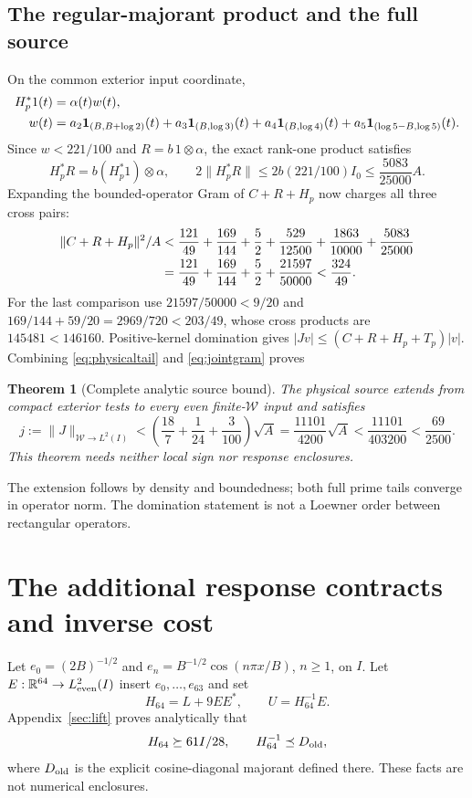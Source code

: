 \documentclass[11pt,a4paper]{article}
\numberwithin{equation}{section}
\newtheorem{theorem}{Theorem}[section]
\theoremstyle{remark}\newtheorem{remark}[theorem]{Remark}
\newcommand{\R}{\mathbb R}\newcommand{\C}{\mathbb C}
\newcommand{\norm}[1]{\lVert#1\rVert}\newcommand{\abs}[1]{\lvert#1\rvert}
\newcommand{\wo}{\mathcal W}\newcommand{\HS}{\mathrm{HS}}
\begin{document}
\subsection{The regular-majorant product and the full source}
On the common exterior input coordinate,
\begin{align*}
 H_p^*1(t)&=\alpha(t)w(t),\\
 w(t)&=a_2\mathbf1_{(B,B+\log2)}(t)+a_3\mathbf1_{(B,\log3)}(t)
 +a_4\mathbf1_{(B,\log4)}(t)+a_5\mathbf1_{(\log5-B,\log5)}(t).
\end{align*}
Since $w<221/100$ and $R=b\,1\otimes\alpha$, the exact rank-one product satisfies
\begin{equation}\label{eq:HpR}
 H_p^*R=b(H_p^*1)\otimes\alpha,\qquad
 2\norm{H_p^*R}\le2b(221/100)I_0\le\frac{5083}{25000}A.
\end{equation}
Expanding the bounded-operator Gram of $C+R+H_p$ now charges all three cross pairs:
\begin{align}
 \norm{C+R+H_p}^2/A
 &<\frac{121}{49}+\frac{169}{144}+\frac52+
   \frac{529}{12500}+\frac{1863}{10000}+\frac{5083}{25000}\notag\\
 &=\frac{121}{49}+\frac{169}{144}+\frac52+\frac{21597}{50000}
 <\frac{324}{49}.\label{eq:jointgram}
\end{align}
For the last comparison use $21597/50000<9/20$ and
$169/144+59/20=2969/720<203/49$, whose cross products are
$145481<146160$.
Positive-kernel domination gives
$|Jv|\le(C+R+H_p+T_p)|v|$.
Combining \eqref{eq:physicaltail} and \eqref{eq:jointgram} proves
\begin{theorem}[Complete analytic source bound]\label{thm:source}
The physical source extends from compact exterior tests to every even finite-$\wo$ input and satisfies
\begin{equation}\label{eq:sourcej}
 j:=\norm J_{\wo\to L^2(I)}
 <\left(\frac{18}{7}+\frac1{24}+\frac3{100}\right)\sqrt A
 =\frac{11101}{4200}\sqrt A<\frac{11101}{403200}<\frac{69}{2500}.
\end{equation}
This theorem needs neither local sign nor response enclosures.
\end{theorem}
The extension follows by density and boundedness; both full prime tails converge in operator norm. The domination statement is not a Loewner order between rectangular operators.

\section{The additional response contracts and inverse cost}\label{sec:response}
Let $e_0=(2B)^{-1/2}$ and
$e_n=B^{-1/2}\cos(n\pi x/B)$, $n\ge1$, on $I$.
Let $E:\R^{64}\to L^2_{\rm even}(I)$ insert $e_0,\ldots,e_{63}$ and set
\[
 H_{64}=L+9EE^*,\qquad U=H_{64}^{-1}E.
\]
Appendix~\ref{sec:lift} proves analytically that
\begin{equation}\label{eq:Hcoercivity}
 H_{64}\succeq61I/28,\qquad H_{64}^{-1}\preceq D_{\rm old},
\end{equation}
where $D_{\rm old}$ is the explicit cosine-diagonal majorant defined there.
These facts are not numerical enclosures.
\end{document}
